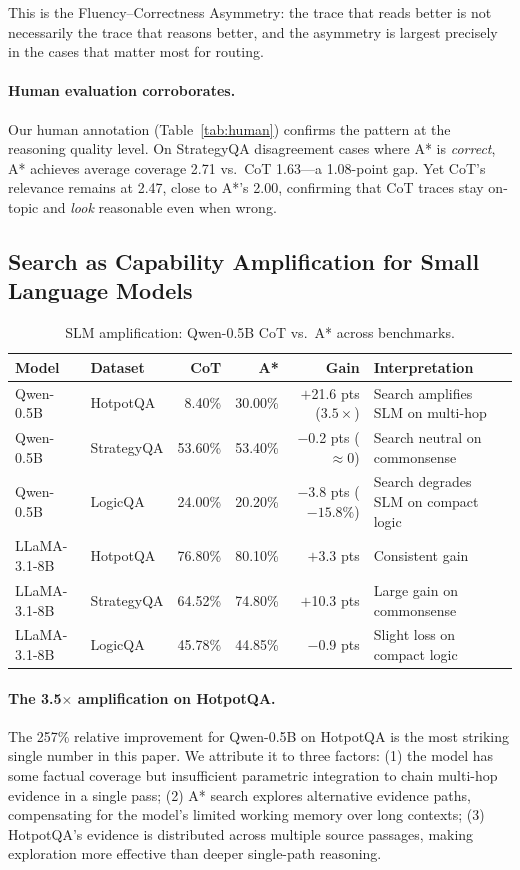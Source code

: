 \documentclass[11pt]{article}
\begin{document}
This is the Fluency--Correctness Asymmetry: the trace that reads better is not necessarily the trace that reasons better, and the asymmetry is largest precisely in the cases that matter most for routing.

\paragraph{Human evaluation corroborates.}
Our human annotation (Table~\ref{tab:human}) confirms the pattern at the reasoning quality level. On StrategyQA disagreement cases where A* is \emph{correct}, A* achieves average coverage 2.71 vs.\ CoT 1.63—a 1.08-point gap. Yet CoT's relevance remains at 2.47, close to A*'s 2.00, confirming that CoT traces stay on-topic and \emph{look} reasonable even when wrong.

\subsection{Search as Capability Amplification for Small Language Models}
\label{sec:slm}

\begin{table}[t]
\centering
\caption{SLM amplification: Qwen-0.5B CoT vs.\ A* across benchmarks.}
\label{tab:slm}
\small
\begin{tabular}{llrrrl}
\toprule
\textbf{Model} & \textbf{Dataset} & \textbf{CoT} & \textbf{A*} & \textbf{Gain} & \textbf{Interpretation} \\
\midrule
Qwen-0.5B & HotpotQA  &  8.40\% & 30.00\% & $+$21.6 pts ($3.5\times$) & Search amplifies SLM on multi-hop \\
Qwen-0.5B & StrategyQA & 53.60\% & 53.40\% & $-$0.2 pts ($\approx$0) & Search neutral on commonsense \\
Qwen-0.5B & LogicQA   & 24.00\% & 20.20\% & $-$3.8 pts ($-15.8\%$) & Search degrades SLM on compact logic \\
\midrule
LLaMA-3.1-8B & HotpotQA  & 76.80\% & 80.10\% & $+$3.3 pts & Consistent gain \\
LLaMA-3.1-8B & StrategyQA & 64.52\% & 74.80\% & $+$10.3 pts & Large gain on commonsense \\
LLaMA-3.1-8B & LogicQA   & 45.78\% & 44.85\% & $-$0.9 pts & Slight loss on compact logic \\
\bottomrule
\end{tabular}
\end{table}

\paragraph{The 3.5$\times$ amplification on HotpotQA.}
The 257\% relative improvement for Qwen-0.5B on HotpotQA is the most striking single number in this paper. We attribute it to three factors: (1) the model has some factual coverage but insufficient parametric integration to chain multi-hop evidence in a single pass; (2) A* search explores alternative evidence paths, compensating for the model's limited working memory over long contexts; (3) HotpotQA's evidence is distributed across multiple source passages, making exploration more effective than deeper single-path reasoning.
\end{document}
